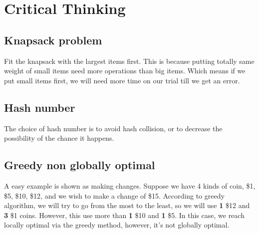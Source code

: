 \documentclass{article}
\begin{document}
\section{Critical Thinking}
\subsection{Knapsack problem}
Fit the knapsack with the largest items first. This is because putting totally same weight of small items need more operations than big items. Which means if we put small items first, we will need more time on our trial till we get an error. 
\subsection{Hash number}
The choice of hash number is to avoid hash collision, or to decrease the possibility of the chance it happens. 
\subsection{Greedy non globally optimal}
A easy example is shown as making changes. Suppose we have 4 kinds of coin, \$1, \$5, \$10, \$12, and we wish to make a change of \$15. According to greedy algorithm, we will try to go from the most to the least, so we will use \textbf{1} \$12 and \textbf{3} \$1 coins. However, this use more than \textbf{1} \$10 and \textbf{1} \$5. In this case, we reach locally optimal via the greedy method, however, it's not globally optimal.
\end{document}
